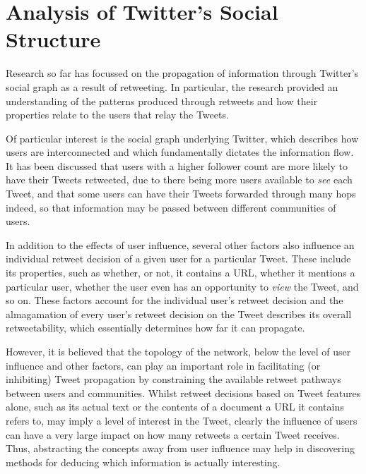 \chapter{Analysis of Twitter's Social Structure}

Research so far has focussed on the propagation of information through Twitter's social graph as a result of retweeting. In particular, the research provided an understanding of the patterns produced through retweets and how their properties relate to the users that relay the Tweets.

Of particular interest is the social graph underlying Twitter, which describes how users are interconnected and which fundamentally dictates the information flow. It has been discussed that users with a higher follower count are more likely to have their Tweets retweeted, due to there being more users available to \textit{see} each Tweet, and that some users can have their Tweets forwarded through many hops indeed, so that information may be passed between different communities of users.

In addition to the effects of user influence,  several other factors also influence an individual retweet decision of a given user for a particular Tweet. These include its properties, such as whether, or not, it contains a URL, whether it mentions a particular user, whether the user even has an opportunity to \textit{view} the Tweet, and so on. These factors account for the individual user's retweet decision and the almagamation of every user's retweet decision on the Tweet describes its overall retweetability, which essentially determines how far it can propagate.

However, it is believed that the topology of the network, below the level of user influence and other factors, can play an important role in facilitating (or inhibiting) Tweet propagation by constraining the available retweet pathways between users and communities. Whilst retweet decisions based on Tweet features alone, such as its actual text or the contents of a document a URL it contains refers to, may imply a level of interest in the Tweet, clearly the influence of users can have a very large impact on how many retweets a certain Tweet receives. Thus, abstracting the concepts away from user influence may help in discovering methods for deducing which information is actually interesting.

